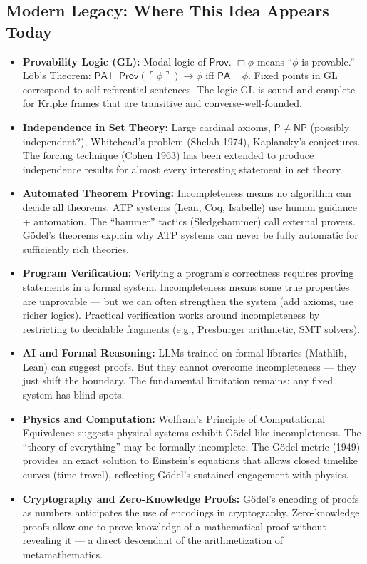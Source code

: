 \subsection{Modern Legacy: Where This Idea Appears Today}
\label{sec:godel:legacy}

\begin{itemize}
\item \textbf{Provability Logic (GL):} Modal logic of $\mathsf{Prov}$. $\Box \phi$ means ``$\phi$ is provable.'' Löb's Theorem: $\mathsf{PA} \vdash \mathsf{Prov}(\ulcorner \phi \urcorner) \to \phi$ iff $\mathsf{PA} \vdash \phi$. Fixed points in GL correspond to self-referential sentences. The logic GL is sound and complete for Kripke frames that are transitive and converse-well-founded.

\item \textbf{Independence in Set Theory:} Large cardinal axioms, $\mathsf{P} \neq \mathsf{NP}$ (possibly independent?), Whitehead's problem (Shelah 1974), Kaplansky's conjectures. The forcing technique (Cohen 1963) has been extended to produce independence results for almost every interesting statement in set theory.

\item \textbf{Automated Theorem Proving:} Incompleteness means no algorithm can decide all theorems. ATP systems (Lean, Coq, Isabelle) use human guidance + automation. The ``hammer'' tactics (Sledgehammer) call external provers. Gödel's theorems explain why ATP systems can never be fully automatic for sufficiently rich theories.

\item \textbf{Program Verification:} Verifying a program's correctness requires proving statements in a formal system. Incompleteness means some true properties are unprovable --- but we can often strengthen the system (add axioms, use richer logics). Practical verification works around incompleteness by restricting to decidable fragments (e.g., Presburger arithmetic, SMT solvers).

\item \textbf{AI and Formal Reasoning:} LLMs trained on formal libraries (Mathlib, Lean) can suggest proofs. But they cannot overcome incompleteness --- they just shift the boundary. The fundamental limitation remains: any fixed system has blind spots.

\item \textbf{Physics and Computation:} Wolfram's Principle of Computational Equivalence suggests physical systems exhibit Gödel-like incompleteness. The ``theory of everything'' may be formally incomplete. The Gödel metric (1949) provides an exact solution to Einstein's equations that allows closed timelike curves (time travel), reflecting Gödel's sustained engagement with physics.

\item \textbf{Cryptography and Zero-Knowledge Proofs:} Gödel's encoding of proofs as numbers anticipates the use of encodings in cryptography. Zero-knowledge proofs allow one to prove knowledge of a mathematical proof without revealing it --- a direct descendant of the arithmetization of metamathematics.
\end{itemize}

